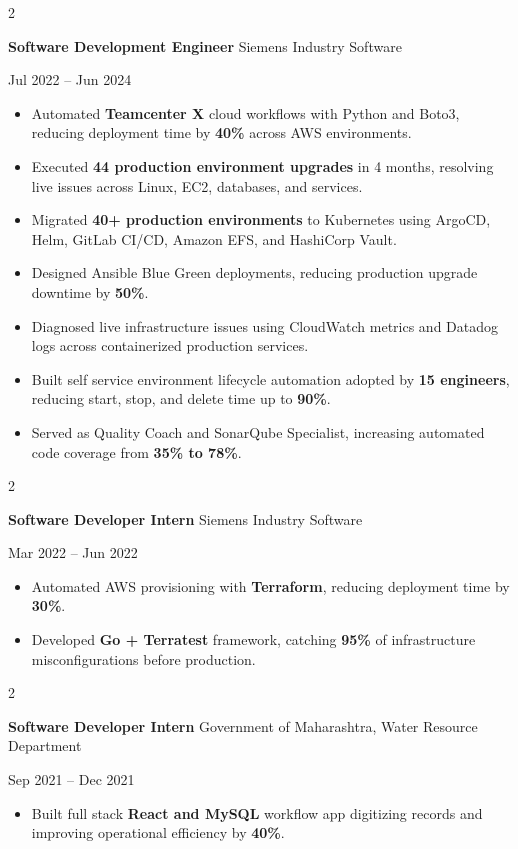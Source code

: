 \documentclass[10pt, letterpaper]{article}
\newenvironment{highlights}{
    \begin{itemize}[
        topsep=0.10 cm,
        parsep=0.06 cm,
        partopsep=0pt,
        itemsep=0.06 cm,
        leftmargin=12pt
    ]
}{
    \end{itemize}
}
\newenvironment{twocolentry}[2][]{
    \onecolentry
    \def\secondColumn{#2}
    \setcolumnwidth{\fill, 4.5 cm}
    \begin{paracol}{2}
}{
    \switchcolumn \raggedleft \secondColumn
    \end{paracol}
    \endonecolentry
}
\begin{document}
\begin{twocolentry}{Jul 2022 -- Jun 2024}
\textbf{Software Development Engineer} \textbar{} Siemens Industry Software
\end{twocolentry}
\begin{highlights}
  \item Automated \textbf{Teamcenter X} cloud workflows with Python and Boto3, reducing deployment time by \textbf{40\%} across AWS environments.
  \item Executed \textbf{44 production environment upgrades} in 4 months, resolving live issues across Linux, EC2, databases, and services.
  \item Migrated \textbf{40+ production environments} to Kubernetes using ArgoCD, Helm, GitLab CI/CD, Amazon EFS, and HashiCorp Vault.
  \item Designed Ansible Blue Green deployments, reducing production upgrade downtime by \textbf{50\%}.
  \item Diagnosed live infrastructure issues using CloudWatch metrics and Datadog logs across containerized production services.
  \item Built self service environment lifecycle automation adopted by \textbf{15 engineers}, reducing start, stop, and delete time up to \textbf{90\%}.
  \item Served as Quality Coach and SonarQube Specialist, increasing automated code coverage from \textbf{35\% to 78\%}.
\end{highlights}

\vspace{0.15 cm}

\begin{twocolentry}{Mar 2022 -- Jun 2022}
\textbf{Software Developer Intern} \textbar{} Siemens Industry Software
\end{twocolentry}
\begin{highlights}
  \item Automated AWS provisioning with \textbf{Terraform}, reducing deployment time by \textbf{30\%}.
  \item Developed \textbf{Go + Terratest} framework, catching \textbf{95\%} of infrastructure misconfigurations before production.
\end{highlights}

\vspace{0.15 cm}

\begin{twocolentry}{Sep 2021 -- Dec 2021}
\textbf{Software Developer Intern} \textbar{} Government of Maharashtra, Water Resource Department
\end{twocolentry}
\begin{highlights}
  \item Built full stack \textbf{React and MySQL} workflow app digitizing records and improving operational efficiency by \textbf{40\%}.
\end{highlights}
\end{document}
